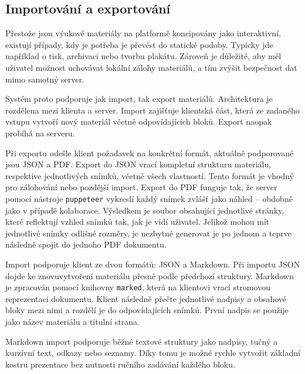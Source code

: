 \subsection{Importování a exportování}

Přestože jsou výukové materiály na platformě koncipovány jako interaktivní, existují případy, kdy je potřeba je převést do statické podoby.
Typicky jde například o tisk, archivaci nebo tvorbu plakátu. 
Zároveň je důležité, aby měl uživatel možnost uchovávat lokální zálohy materiálů, a tím zvýšit bezpečnost dat mimo samotný server.

Systém proto podporuje jak import, tak export materiálů. 
Architektura je rozdělena mezi klienta a server. Import zajišťuje klientská část, která ze zadaného vstupu vytvoří nový materiál včetně odpovídajících bloků. 
Export naopak probíhá na serveru.

Při exportu odešle klient požadavek na konkrétní formát, aktuálně podporované jsou JSON a PDF. 
Export do JSON vrací kompletní strukturu materiálu, respektive jednotlivých snímků, včetně všech vlastností. 
Tento formát je vhodný pro zálohování nebo pozdější import. 
Export do PDF funguje tak, že server pomocí nástroje \texttt{puppeteer} vykreslí každý snímek zvlášť jako náhled -- obdobně jako v případě kolaborace. 
Výsledkem je soubor obsahující jednotlivé stránky, které reflektují vzhled snímků tak, jak je vidí uživatel.
Jelikož mohou mít jednotlivé snímky odlišné rozměry, je nezbytné generovat je po jednom a teprve následně spojit do jednoho PDF dokumentu.

Import podporuje klient ze dvou formátů: JSON a Markdown. 
Při importu JSON dojde ke znovuvytvoření materiálu přesně podle předchozí struktury. 
Markdown je zpracován pomocí knihovny \texttt{marked}, která na klientovi vrací stromovou reprezentaci dokumentu. 
Klient následně přečte jednotlivé nadpisy a obsahové bloky mezi nimi a rozdělí je do odpovídajících snímků. 
První nadpis se použije jako název materiálu a titulní strana.

Markdown import podporuje běžné textové struktury jako nadpisy, tučný a kurzívní text, odkazy nebo seznamy. 
Díky tomu je možné rychle vytvořit základní kostru prezentace bez nutnosti ručního zadávání každého bloku.



